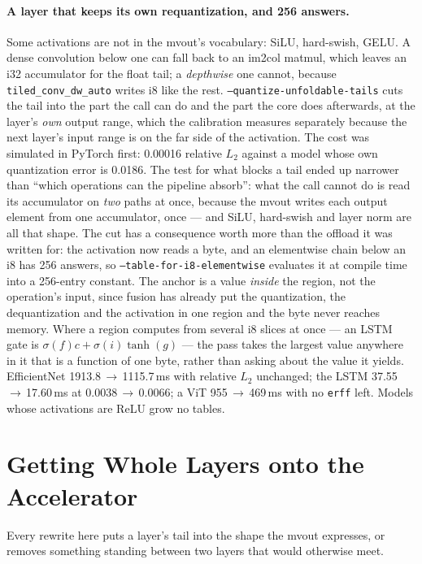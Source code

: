 \documentclass[runningheads]{llncs}
\begin{document}
\paragraph{A layer that keeps its own requantization, and 256 answers.} Some
activations are not in the mvout's vocabulary: SiLU, hard-swish, GELU. A dense
convolution below one can fall back to an im2col matmul, which leaves an i32
accumulator for the float tail; a \emph{depthwise} one cannot, because
\texttt{tiled\_conv\_dw\_auto} writes i8 like the rest.
\texttt{--quantize-unfoldable-tails} cuts the tail into the part the call can do
and the part the core does afterwards, at the layer's \emph{own} output range,
which the calibration measures separately because the next layer's input range is
on the far side of the activation. The cost was simulated in PyTorch first:
0.00016 relative $L_2$ against a model whose own quantization error is 0.0186. The test for what blocks a tail
ended up narrower than ``which operations can the pipeline absorb'': what the call
cannot do is read its accumulator on \emph{two} paths at once, because the mvout
writes each output element from one accumulator, once --- and SiLU, hard-swish and
layer norm are all that shape. The cut has a consequence worth more than the offload it was written
for: the activation now reads a byte, and an elementwise chain below an i8 has 256
answers, so \texttt{--table-for-i8-elementwise} evaluates it at compile time into a
256-entry constant. The anchor is a value \emph{inside} the region, not the
operation's input, since fusion has already put the quantization, the
dequantization and the activation in one region and the byte never reaches memory.
Where a region computes from several i8 slices at once --- an LSTM gate is
$\sigma(f)c + \sigma(i)\tanh(g)$ --- the pass takes the largest value anywhere
in it that is a function of one byte, rather than asking about the value it
yields. EfficientNet 1913.8\,$\to$\,1115.7\,ms with relative $L_2$ unchanged; the
LSTM 37.55\,$\to$\,17.60\,ms at 0.0038\,$\to$\,0.0066; a ViT 955\,$\to$\,469\,ms
with no \texttt{erff} left. Models whose activations are ReLU grow no tables.

\section{Getting Whole Layers onto the Accelerator}
\label{sec:folding}

Every rewrite here puts a layer's tail into the shape the mvout expresses, or
removes something standing between two layers that would otherwise meet.
\end{document}
